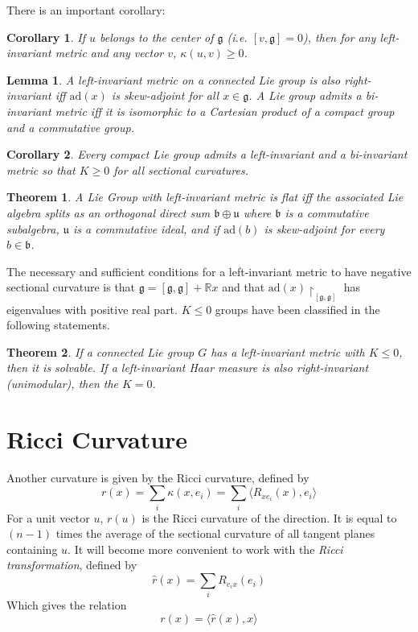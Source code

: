 \documentclass{article}
\newtheorem{thm}{Theorem}
\newtheorem{cor}{Corollary}
\newtheorem{lem}{Lemma}
\begin{document}
There is an important corollary:

\begin{cor}
If $u$ belongs to the center of $\mathfrak{g}$ (i.e. $[v,\mathfrak{g}]=0$), then for any left-invariant metric and any vector $v$, $\kappa(u,v) \geq 0$.
\end{cor}

\begin{lem}
A left-invariant metric on a connected Lie group is also right-invariant iff $\mathrm{ad}(x)$ is skew-adjoint for all $x \in \mathfrak{g}$. A Lie group admits a bi-invariant metric iff it is isomorphic to a Cartesian product of a compact group and a commutative group.
\end{lem}

\begin{cor}
Every compact Lie group admits a left-invariant and a bi-invariant metric so that $K \geq 0$ for all sectional curvatures.
\end{cor}

\begin{thm}
A Lie Group with left-invariant metric is flat iff the associated Lie algebra splits as an orthogonal direct sum $\mathfrak{b}\oplus \mathfrak{u}$ where $\mathfrak{b}$ is a commutative subalgebra, $\mathfrak{u}$ is a commutative ideal, and if $\mathrm{ad}(b)$ is skew-adjoint for every $b\in \mathfrak{b}$.
\end{thm}

\indent The necessary and sufficient conditions for a left-invariant metric to have negative sectional curvature is that $\mathfrak{g}=[\mathfrak{g},\mathfrak{g}]+\mathbb{R}x$ and that $\mathrm{ad}(x)\restriction_{[\mathfrak{g},\mathfrak{g}]}$ has eigenvalues with positive real part. $K \leq 0$ groups have been classified in the following statements.

\begin{thm}
If a connected Lie group $G$ has a left-invariant metric with $K \leq 0$, then it is solvable. If a left-invariant Haar measure is also right-invariant (unimodular), then the $K=0$.
\end{thm}

\section{Ricci Curvature}
\indent Another curvature is given by the Ricci curvature, defined by 
\begin{equation}
    r(x)=\sum_i \kappa(x,e_i) = \sum_i \langle R_{x e_i}(x),e_i \rangle
\end{equation}
\indent For a unit vector $u$, $r(u)$ is the Ricci curvature of the direction. It is equal to $(n-1)$ times the average of the sectional curvature of all tangent planes containing $u$. It will become more convenient to work with the \textit{Ricci transformation}, defined by
\begin{equation}
    \widehat{r}(x)=\sum_i R_{e_i x}(e_i)
\end{equation}
\indent Which gives the relation
\begin{equation}
    r(x)=\langle \widehat{r}(x),x \rangle
\end{equation}
\end{document}
